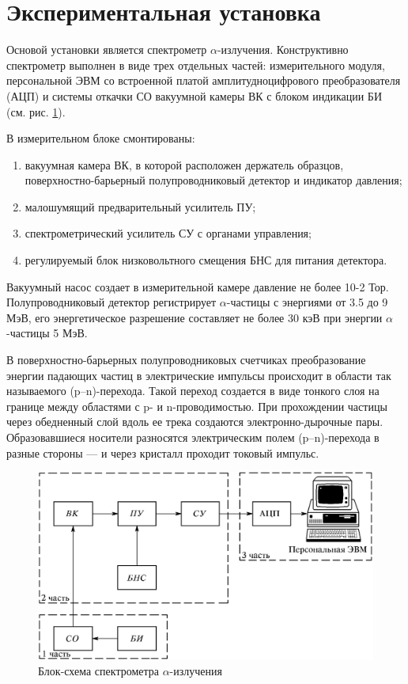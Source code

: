 \documentclass[a4paper,12pt]{article}
\begin{document}
\section{Экспериментальная установка}

Основой установки является спектрометр $\alpha$-излучения. Конструктивно спектрометр выполнен в виде трех отдельных частей: измерительного модуля, персональной ЭВМ со встроенной платой амплитудноцифрового преобразователя (АЦП) и системы откачки СО вакуумной камеры ВК с блоком индикации БИ (см. рис. \ref{pic:ustan}).


В измерительном блоке смонтированы:
\begin{enumerate}[label=\arabic*)]
    \item вакуумная камера ВК, в которой расположен держатель образцов, поверхностно-барьерный полупроводниковый детектор и индикатор давления;
    \item малошумящий предварительный усилитель ПУ;
    \item спектрометрический усилитель СУ с органами управления;
    \item регулируемый блок низковольтного смещения БНС для питания детектора.
\end{enumerate}


Вакуумный насос создает в измерительной камере давление не более 10-2 Тор. Полупроводниковый детектор регистрирует $\alpha$-частицы с энергиями от 3.5 до 9 МэВ, его энергетическое разрешение составляет не более 30 кэВ при энергии $\alpha$-частицы 5 МэВ.


В поверхностно-барьерных полупроводниковых счетчиках преобразование энергии падающих частиц в электрические импульсы происходит в области так называемого (p–n)-перехода. Такой переход создается в виде тонкого слоя на границе между областями с p- и n-проводимостью. При прохождении частицы через обедненный слой вдоль ее трека создаются электронно-дырочные пары. Образовавшиеся носители разносятся электрическим полем (p–n)-перехода в разные стороны — и через кристалл проходит токовый импульс.

\FloatBarrier
\begin{figure}[h]
    \begin{center}
        \includegraphics[width = 1\textwidth]{pics/ustan.png}
        \caption{Блок-схема спектрометра $\alpha$-излучения}
    \label{pic:ustan}
    \end{center}
\end{figure}
\FloatBarrier
\end{document}
